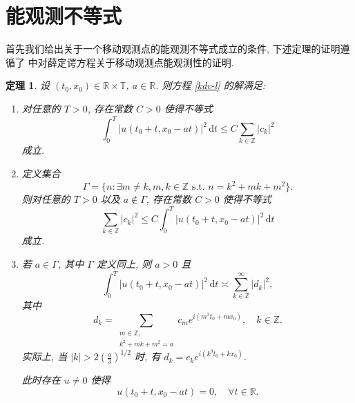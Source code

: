 \documentclass[master]{cugthesis}
\newcommand\R{\ensuremath{\mathbb{R}}}
\newcommand\Z{\ensuremath{\mathbb{Z}}}
\newcommand\T{\ensuremath{\mathbb{T}}}
\renewcommand\d{\ensuremath{\,\mathrm{d}}}
\newtheorem{theorem}{定理}[chapter]
\begin{document}
\iffalse    \section{能观测不等式}
    首先我们给出关于一个移动观测点的能观测不等式成立的条件, 下述定理的证明遵循了 \cite{jaming2020moving} 中对薛定谔方程关于移动观测点能观测性的证明.
    \begin{theorem}\label{thm3-2-1}
    设 $(t_0,x_0)\in \R\times \T$, $a\in \R$. 则方程 \eqref{kdv-l} 的解满足:
    \begin{enumerate}
        \item[\rm{(1)}] 对任意的 $T>0$, 存在常数 $C>0$ 使得不等式
        \begin{equation}\label{3-2-1}
            \int_0^T\left| u(t_0+t,x_0-at) \right|^2\d t \le C  \sum_{k\in \Z} |c_k|^2
        \end{equation}
        成立.
        \item[\rm{(2)}] 定义集合
        \begin{equation*}
            \Gamma=\lbrace n:\exists m\neq k, m,k\in \Z \text{ s.t. }n=k^2+mk+m^2 \rbrace.
        \end{equation*}
        则对任意的 $T>0$ 以及 $a\notin \Gamma$, 存在常数 $C>0$ 使得不等式
        \begin{equation}\label{3-2-2}
            \sum_{k\in\Z} |c_k|^2 \le C \int_0^T |u(t_0+t,x_0-at)|^2 \d t
        \end{equation}
        成立.
        \item[\rm{(3)}] 若 $a\in \Gamma$, 其中 $\Gamma$ 定义同上, 则 $a>0$ 且
        \begin{equation}\label{3-2-3}
            \int_0^T |u(t_0+t,x_0-at)|^2\d t\asymp \sum_{k\in\Z}^\infty|d_k|^2,
        \end{equation}
        其中
        \begin{equation*}
            d_k=\sum_{\substack{
                m\in \Z,  \\
                k^2+mk+m^2 = a }} 
             c_me^{i(m^3t_0+mx_0)},\quad k\in \Z.
        \end{equation*}
        实际上, 当 $|k|> 2\left(\frac{a}{3}\right)^{1 /2}$ 时, 有 $d_k=c_k e^{i (k^3t_0+kx_0)}$.
        
        此时存在 $u\neq 0$ 使得
        \begin{equation*}
            u(t_0+t,x_0-at)=0, \quad\forall t\in \R.
        \end{equation*}
    \end{enumerate}
    \end{theorem}
    
\end{document}
